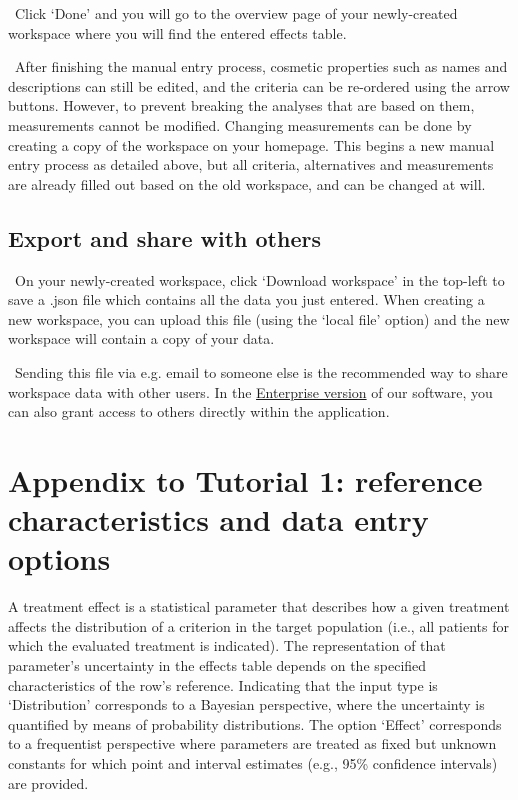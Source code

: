 \documentclass[00_mcda_tutorial.tex]{subfiles}
\begin{document}
\noindent \leftpointright \, Click ‘Done’ and you will go to the overview page of your newly-created workspace where you will find the entered effects table.
\newline

\noindent \faGraduationCap \, After finishing the manual entry process, cosmetic properties such as names and descriptions can still be edited, and the criteria can be re-ordered using the arrow buttons. However, to prevent breaking the analyses that are based on them, measurements cannot be modified. Changing measurements can be done by creating a copy of the workspace on your homepage. This begins a new manual entry process as detailed above, but all criteria, alternatives and measurements are already filled out based on the old workspace, and can be changed at will.

\subsection*{Export and share with others}
\noindent \leftpointright \, On your newly-created workspace, click ‘Download workspace’ in the top-left to save a .json file which contains all the data you just entered. When creating a new workspace, you can upload this file (using the ‘local file’ option) and the new workspace will contain a copy of your data.
\newline

\noindent \faLightbulbO \, Sending this file via e.g. email to someone else is the recommended way to share workspace data with other users. In the \href{http://drugis.org/services/index}{Enterprise version} of our software, you can also grant access to others directly within the application.
\clearpage




\section*{Appendix to Tutorial 1: reference characteristics and data entry options}
\label{appendix1}

A treatment effect is a statistical parameter that describes how a given treatment affects the distribution of a criterion in the target population (i.e., all patients for which the evaluated treatment is indicated). The representation of that parameter’s uncertainty in the effects table depends on the specified characteristics of the row’s reference. Indicating that the input type is ‘Distribution’ corresponds to a Bayesian perspective, where the uncertainty is quantified by means of probability distributions. The option ‘Effect’ corresponds to a frequentist perspective where parameters are treated as fixed but unknown constants for which point and interval estimates (e.g., 95\% confidence intervals) are provided.
\end{document}
